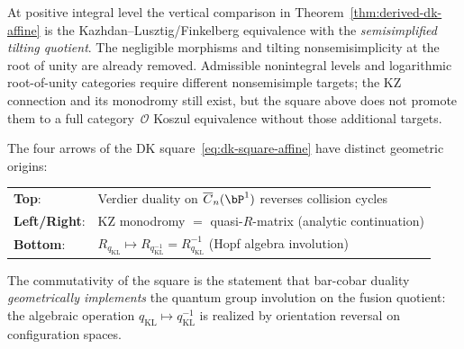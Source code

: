 \begin{remark}
\label{rem:dk-affine-root-admissible-scope}
At positive integral level the vertical comparison in
Theorem~\ref{thm:derived-dk-affine} is the
Kazhdan--Lusztig/Finkelberg equivalence with the
\emph{semisimplified tilting quotient}. The negligible morphisms and
tilting nonsemisimplicity at the root of unity are already removed.
Admissible nonintegral levels and logarithmic root-of-unity categories
require different nonsemisimple targets; the KZ connection and its
monodromy still exist, but the square above does not promote them to a
full category~$\mathcal O$ Koszul equivalence without those additional
targets.
\end{remark}

\begin{remark}\label{rem:dk-square-geometry}
The four arrows of the DK square~\eqref{eq:dk-square-affine} have
distinct geometric origins:
\begin{center}
\renewcommand{\arraystretch}{1.2}
\begin{tabular}{ll}
\textbf{Top}: & Verdier duality on $\overline{C}_n(\bP^1)$
 reverses collision cycles \\
\textbf{Left/Right}: & KZ monodromy $=$ quasi-$R$-matrix
 (analytic continuation) \\
\textbf{Bottom}: & $R_{q_{\mathrm{KL}}} \mapsto
 R_{q_{\mathrm{KL}}^{-1}} = R_{q_{\mathrm{KL}}}^{-1}$
 (Hopf algebra involution)
\end{tabular}
\end{center}
The commutativity of the square is the statement that
bar-cobar duality \emph{geometrically implements} the quantum
group involution on the fusion quotient: the algebraic operation
$q_{\mathrm{KL}} \mapsto q_{\mathrm{KL}}^{-1}$
is realized by orientation reversal on configuration spaces.
\end{remark}

